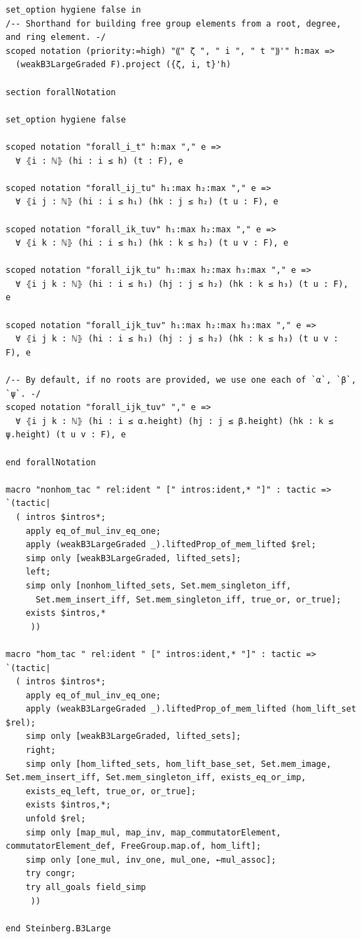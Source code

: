 \begin{Verbatim}
set_option hygiene false in
/-- Shorthand for building free group elements from a root, degree, and ring element. -/
scoped notation (priority:=high) "⸨" ζ ", " i ", " t "⸩'" h:max =>
  (weakB3LargeGraded F).project ({ζ, i, t}'h)

section forallNotation

set_option hygiene false

scoped notation "forall_i_t" h:max "," e =>
  ∀ ⦃i : ℕ⦄ (hi : i ≤ h) (t : F), e

scoped notation "forall_ij_tu" h₁:max h₂:max "," e =>
  ∀ ⦃i j : ℕ⦄ (hi : i ≤ h₁) (hk : j ≤ h₂) (t u : F), e

scoped notation "forall_ik_tuv" h₁:max h₂:max "," e =>
  ∀ ⦃i k : ℕ⦄ (hi : i ≤ h₁) (hk : k ≤ h₂) (t u v : F), e

scoped notation "forall_ijk_tu" h₁:max h₂:max h₃:max "," e =>
  ∀ ⦃i j k : ℕ⦄ (hi : i ≤ h₁) (hj : j ≤ h₂) (hk : k ≤ h₃) (t u : F), e

scoped notation "forall_ijk_tuv" h₁:max h₂:max h₃:max "," e =>
  ∀ ⦃i j k : ℕ⦄ (hi : i ≤ h₁) (hj : j ≤ h₂) (hk : k ≤ h₃) (t u v : F), e

/-- By default, if no roots are provided, we use one each of `α`, `β`, `ψ`. -/
scoped notation "forall_ijk_tuv" "," e =>
  ∀ ⦃i j k : ℕ⦄ (hi : i ≤ α.height) (hj : j ≤ β.height) (hk : k ≤ ψ.height) (t u v : F), e

end forallNotation

macro "nonhom_tac " rel:ident " [" intros:ident,* "]" : tactic => `(tactic|
  ( intros $intros*;
    apply eq_of_mul_inv_eq_one;
    apply (weakB3LargeGraded _).liftedProp_of_mem_lifted $rel;
    simp only [weakB3LargeGraded, lifted_sets];
    left;
    simp only [nonhom_lifted_sets, Set.mem_singleton_iff,
      Set.mem_insert_iff, Set.mem_singleton_iff, true_or, or_true];
    exists $intros,*
     ))

macro "hom_tac " rel:ident " [" intros:ident,* "]" : tactic => `(tactic|
  ( intros $intros*;
    apply eq_of_mul_inv_eq_one;
    apply (weakB3LargeGraded _).liftedProp_of_mem_lifted (hom_lift_set $rel);
    simp only [weakB3LargeGraded, lifted_sets];
    right;
    simp only [hom_lifted_sets, hom_lift_base_set, Set.mem_image, Set.mem_insert_iff, Set.mem_singleton_iff, exists_eq_or_imp,
    exists_eq_left, true_or, or_true];
    exists $intros,*;
    unfold $rel;
    simp only [map_mul, map_inv, map_commutatorElement, commutatorElement_def, FreeGroup.map.of, hom_lift];
    simp only [one_mul, inv_one, mul_one, ←mul_assoc];
    try congr;
    try all_goals field_simp
     ))

end Steinberg.B3Large
\end{Verbatim}
